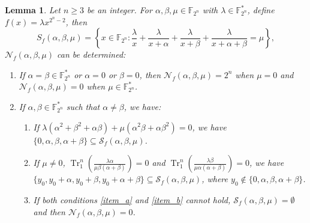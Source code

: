 \documentclass{article}
\newcommand{\F}{\mathbb{F}}
\newcommand{\0}{\textbf{0}}
\newcommand{\1}{\textbf{1}}
\newcommand{\TrN}{\operatorname{Tr}_1^n}
\theoremstyle{plain}
\newtheorem{lemma}{Lemma}
\begin{document}

    \begin{lemma}\label{lemma:num_sol_second_dev}
        Let $ n\ge 3 $ be an integer. For $ \alpha,\beta,\mu\in\F_{2^n} $ with $ \lambda\in\F_{2^n}^* $, define $ f(x)=\lambda x^{2^n-2} $, then 
        \[S_f(\alpha,\beta,\mu)=\left\{ x\in\F_{2^n}:\frac{\lambda}{x}+\frac{\lambda}{x+\alpha}+\frac{\lambda}{x+\beta}+\frac{\lambda}{x+\alpha+\beta}=\mu \right\},\]
        $ \mathcal{N}_f(\alpha,\beta,\mu) $ can be determined: 
        \begin{enumerate}[label=(\arabic{*})]
            \item If $ \alpha=\beta\in\F_{2^n}^* $ or $ \alpha=0 $ or $ \beta=0 $, 
            then $ \mathcal{N}_f(\alpha,\beta,\mu)=2^n $ when $ \mu = 0 $ and $ \mathcal{N}_f(\alpha,\beta,\mu)=0 $ when $ \mu\in\F_{2^n}^* $.
            \item If $ \alpha,\beta\in\F_{2^n}^* $ such that $ \alpha\ne\beta $, we have: 
            \begin{enumerate}[ref=(\alph{*})]
                \item If $ \lambda(\alpha^2+\beta^2+\alpha\beta)+\mu(\alpha^2\beta+\alpha\beta^2)=0 $, we have 
                $ \{0,\alpha,\beta,\alpha+\beta\}\subseteq\mathcal{S}_f(\alpha,\beta,\mu) $.\label{item_a}
                \item If $ \mu\ne 0 $, $ \TrN\left(\frac{\lambda\alpha}{\mu \beta(\alpha+\beta)}\right)=0 $ and 
                $ \TrN\left(\frac{\lambda \beta}{\mu \alpha(\alpha+\beta)}\right)=0 $, we have 
                $ \{y_0,y_0+\alpha,y_0+\beta,y_0+\alpha+\beta\}\subseteq\mathcal{S}_f(\alpha,\beta,\mu) $, where $ y_0\notin\{0,\alpha,\beta,\alpha+\beta\} $.\label{item_b}
                \item If both conditions \ref{item_a} and \ref{item_b} cannot hold, $ \mathcal{S}_f(\alpha,\beta,\mu)=\emptyset $ and then $ \mathcal{N}_f(\alpha,\beta,\mu)=0  $.
            \end{enumerate}
        \end{enumerate}
    \end{lemma}
\end{document}
